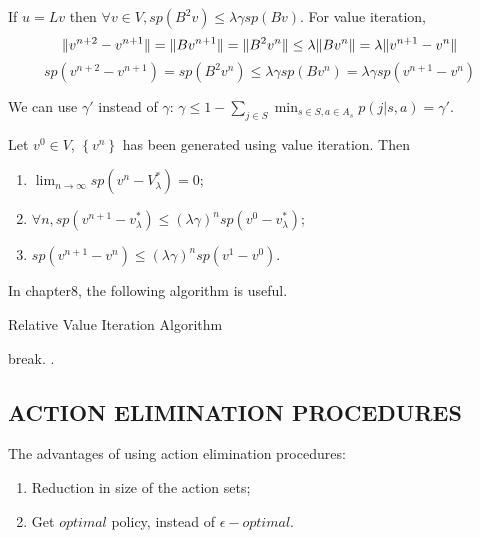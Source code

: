 If $ u = Lv $ then $ \forall v \in V, sp(B^2 v) \le \lambda \gamma sp(Bv) $.
For value iteration,
\[
    \Arrowvert v^{n+2} - v^{n+1} \Arrowvert = \Arrowvert B v^{n+1} \Arrowvert = \Arrowvert B^2 v^n \Arrowvert\le \lambda \Arrowvert B v^n \Arrowvert = \lambda \Arrowvert v^{n+1} - v^n \Arrowvert
\]
\[
    sp(v^{n+2} - v^{n+1}) = sp(B^2 v^n) \le \lambda \gamma sp(B v^n) = \lambda \gamma sp(v^{n+1} - v^n)
\]

We can use $ \gamma' $ instead of $ \gamma $: $ \gamma \le 1 - \sum^{}_{j \in S} \min_{s \in S, a \in A_s} p(j | s, a) = \gamma' $.  

\begin{corollary}
    Let $ v^0 \in V $, $ \left\{ v^n \right\} $ has been generated using value iteration. Then
    \begin{enumerate}
        \item $ \lim_{n \to \infty} sp(v^n - V^*_{\lambda}) = 0 $;
        \item $ \forall n, sp(v^{n+1} - v^{*}_{\lambda}) \le {(\lambda \gamma)}^{n} sp(v^0 - v^*_{\lambda}) $;
        \item $ sp(v^{n+1} - v^n) \le {(\lambda \gamma)}^{n} sp(v^1 - v^0) $.
    \end{enumerate}
\end{corollary}

In chapter8, the following algorithm is useful.
\begin{algorithm}
    \caption{Relative Value Iteration Algorithm}
    \begin{algorithmic}
             {break}\EndIf.
        \EndFor.
    \end{algorithmic}
\end{algorithm}

\subsection{ACTION ELIMINATION PROCEDURES}%

The advantages of using action elimination procedures:
\begin{enumerate}
    \item Reduction in size of the action sets;
    \item Get $ optimal $ policy, instead of $ \epsilon-optimal $.
\end{enumerate}

